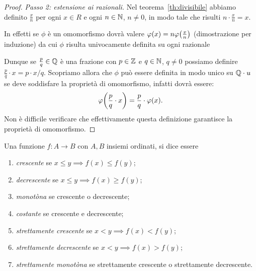 \begin{proof}
\emph{Passo 2: estensione ai razionali.} 
Nel teorema~\ref{th:divisibile}
abbiamo definito $\frac x n$ per ogni $x\in R$ e ogni $n\in {\mathbb N}$, $n\neq 0$,
in modo tale che risulti $n\cdot \frac{x}{n}=x$.

In effetti se $\phi$ è un omomorfismo dovrà valere $\varphi(x) = n \varphi{\left( \frac x n \right)}$
(dimostrazione per induzione) da cui $\phi$ risulta univocamente definita 
su ogni razionale 

Dunque se $\frac{p}{q}\in{\mathbb Q}$ è una frazione con $p\in {\mathbb Z}$ e $q\in {\mathbb N}$, $q\neq 0$ 
possiamo definire $\frac{p}{q}\cdot x = p\cdot x/q$.
Scopriamo allora che $\phi$ può essere definita in modo unico su ${\mathbb Q}\cdot u$ 
se deve soddisfare la proprietà di omomorfismo, 
infatti dovrà essere:
\[
  \varphi{\left( \frac{p}{q}\cdot x \right)} = \frac{p}{q}\cdot \varphi(x).
\]
Non è difficile verificare che effettivamente questa definizione garantisce la 
proprietà di omomorfismo.
\end{proof}

\begin{definition}
  \label{def:monotonia}%
  \mymark{***}%
  Una funzione $f\colon A \to B$ con $A,B$ insiemi ordinati, si
  dice essere
  \begin{enumerate}
  \item \emph{crescente}%
%
 se $x \le y \implies f(x) \le f(y)$;
  \item \emph{decrescente}%
%
 se $x \le y \implies f(x) \ge f(y)$;
  \item \emph{monotòna}%
%
 se crescente o decrescente;
  \item \emph{costante}%
%
 se crescente e decrescente;
  \item \emph{strettamente crescente}%
%
 se $x<y \implies f(x) < f(y)$;
  \item \emph{strettamente decrescente}%
%
 se $x<y \implies f(x) > f(y)$;
  \item \emph{strettamente monotòna}%
%
 se strettamente crescente o strettamente decrescente.
  \end{enumerate}
\end{definition}

